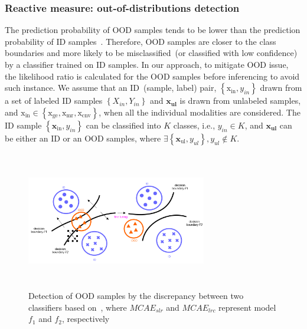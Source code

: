 \subsubsection{Reactive measure: out-of-distributions detection}
\noindent The prediction probability of OOD samples tends to be lower than the prediction probability of ID samples~\cite{OOD18}. Therefore, OOD samples are closer to the class boundaries and more likely to be misclassified~(or classified with low confidence) by a classifier trained on ID samples. In our approach, to mitigate OOD issue, the likelihood ratio is calculated for the OOD samples before inferencing to avoid such instance.  
We assume that an ID~(sample, label) pair, $\left\{\mathrm{x}_{\text {in}}, y_{in}\right\}$ drawn from a set of labeled ID samples $\left\{X_{in}, Y_{in}\right\}$ and $\mathbf{x}_{\mathbf{ul}}$ is drawn from unlabeled samples, and $\mathrm{x}_\text{in} \in \left\{\mathrm{x}_{\text {ge}}, \mathrm{x}_{\text {mr}}, \mathrm{x}_{\text {cnv}}\right\}$, when all the individual modalities are considered. The ID sample $\left\{\mathbf{x}_{\text {in}}, y_{in}\right\}$ can be classified into $K$ classes, i.e., $y_{in} \in K$, and $\mathbf{x}_{\mathbf{ul}}$ can be either an ID or an OOD samples, where $\exists\left\{\mathbf{x}_{\text {ul}}, y_{ul}\right\}, y_{ul} \notin K$. 

\begin{figure}
    \centering
    \includegraphics[width=0.7\textwidth,height=60mm]{images/ood_ex_1.png}
    \caption{Detection of OOD samples by the discrepancy between two classifiers based on~\cite{OOD19}, where $MCAE_{slr}$ and $MCAE_{lrc}$ represent model $f_1$ and $f_2$, respectively}
    \label{fig:ood_detection_example}
    \vspace{-4mm}
\end{figure}

